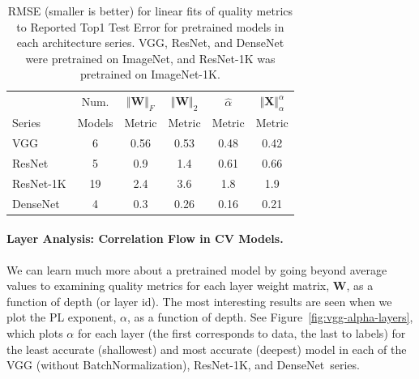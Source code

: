 \begin{table}[t]
\small
\begin{center}
\begin{tabular}{|p{0.75in}|c|c|c|c|c|}
\hline
        & Num.   & $\Vert\mathbf{W}\Vert_{F}$ & $\Vert\mathbf{W}\Vert_{2}$ & $\hat{\alpha}$ & $\Vert\mathbf{X}\Vert^{\alpha}_{\alpha}$ \\
 Series & Models & Metric                     & Metric                     & Metric         & Metric                                   \\
\hline
 VGG & 6 & 0.56 & 0.53 & 0.48 & 0.42  \\
 ResNet & 5 & 0.9 & 1.4 & 0.61 & 0.66  \\
 ResNet-1K & 19 & 2.4 & 3.6 & 1.8 & 1.9  \\
 DenseNet & 4 & 0.3 & 0.26 & 0.16 & 0.21 \\
\hline
\end{tabular}
\end{center}
\caption{RMSE (smaller is better) for linear fits of quality metrics to Reported Top1 Test Error for pretrained models in each architecture series.  VGG, ResNet, and DenseNet were pretrained on ImageNet, and ResNet-1K was pretrained on ImageNet-1K. }
\label{table:cv-models}
\end{table}


\paragraph{Layer Analysis: Correlation Flow in CV Models.}

We can learn much more about a pretrained model by going beyond average values to examining quality metrics for each layer weight matrix, $\mathbf{W}$, as a function of depth (or layer id).  %
The most interesting results are seen when we plot the PL exponent, $\alpha$, as a function of depth.
%
See Figure~\ref{fig:vgg-alpha-layers}, which plots $\alpha$ for each layer (the first corresponds to data, the last to labels) for the least accurate (shallowest) and most accurate (deepest) model in each of the VGG (without BatchNormalization), ResNet-1K, and DenseNet~series.

